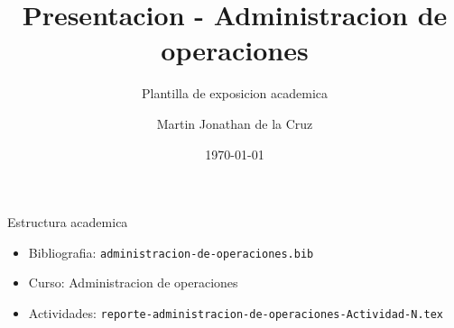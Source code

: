 ﻿\documentclass[spanish,aspectratio=169]{beamer}
\title{Presentacion - Administracion de operaciones}
\subtitle{Plantilla de exposicion academica}
\author{Martin Jonathan de la Cruz}
\institute{Universidad Ciudadana de Nuevo Leon}
\date{\today}
\begin{document}
\begin{frame}
  \titlepage
\end{frame}

\begin{frame}{Estructura academica}
  \begin{itemize}
    \item Bibliografia: \texttt{administracion-de-operaciones.bib}
    \item Curso: Administracion de operaciones
    \item Actividades: \texttt{reporte-administracion-de-operaciones-Actividad-N.tex}
  \end{itemize}
\end{frame}
\end{document}
